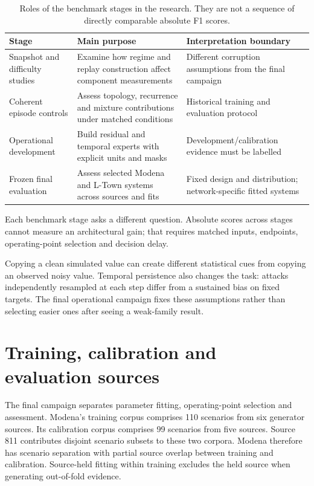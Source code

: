 \begin{table}[tbp]
\centering\small
\caption[Roles of the benchmark stages in the research]{Roles of the benchmark stages in the research. They are not a sequence of directly comparable absolute F1 scores.}
\label{tab:regimes}
\begin{tabularx}{\linewidth}{@{}lYY@{}}
\toprule
Stage & Main purpose & Interpretation boundary\\
\midrule
Snapshot and difficulty studies & Examine how regime and replay construction affect component measurements & Different corruption assumptions from the final campaign\\
Coherent episode controls & Assess topology, recurrence and mixture contributions under matched conditions & Historical training and evaluation protocol\\
Operational development & Build residual and temporal experts with explicit units and masks & Development/calibration evidence must be labelled\\
Frozen final evaluation & Assess selected Modena and L-Town systems across sources and fits & Fixed design and distribution; network-specific fitted systems\\
\bottomrule
\end{tabularx}
\end{table}

Each benchmark stage asks a different question. Absolute scores across stages cannot measure an architectural gain; that requires matched inputs, endpoints, operating-point selection and decision delay.

Copying a clean simulated value can create different statistical cues from copying an observed noisy value. Temporal persistence also changes the task: attacks independently resampled at each step differ from a sustained bias on fixed targets. The final operational campaign fixes these assumptions rather than selecting easier ones after seeing a weak-family result.

\section{Training, calibration and evaluation sources}
The final campaign separates parameter fitting, operating-point selection and assessment. Modena's training corpus comprises 110 scenarios from six generator sources. Its calibration corpus comprises 99 scenarios from five sources. Source 811 contributes disjoint scenario subsets to these two corpora. Modena therefore has scenario separation with partial source overlap between training and calibration. Source-held fitting within training excludes the held source when generating out-of-fold evidence.


